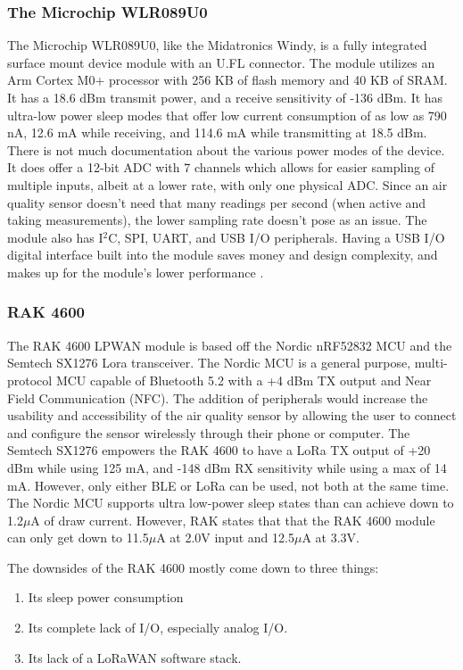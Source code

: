 \subsubsection{The Microchip WLR089U0}
The Microchip WLR089U0, like the Midatronics Windy, is a fully integrated
surface mount device module with an U.FL connector. The module utilizes an Arm
Cortex M0+ processor with 256 KB of flash memory and 40 KB of SRAM. It has a
18.6 dBm transmit power, and a receive sensitivity of -136 dBm. It has ultra-low
power sleep modes that offer low current consumption of as low as 790 nA, 12.6 mA
while receiving, and 114.6 mA while transmitting at 18.5 dBm. There is not much
documentation about the various power modes of the device. It does offer a
12-bit ADC with 7 channels which allows for easier sampling of multiple inputs,
albeit at a lower rate, with only one physical ADC. Since an air quality sensor
doesn't need that many readings per second (when active and taking
measurements), the lower sampling rate doesn't pose as an issue. The module also
has I$^2$C, SPI, UART, and USB I/O peripherals. Having a USB I/O digital
interface built into the module saves money and design complexity, and makes up
for the module's lower performance \cite{ds-wlr089u0}\cite{ds-atsamr34j18}.

\subsubsection{RAK 4600}
The RAK 4600 LPWAN module is based off the Nordic nRF52832 MCU and the
Semtech SX1276 Lora transceiver. The Nordic MCU is a general purpose,
multi-protocol MCU capable of Bluetooth 5.2 with a +4 dBm TX output and Near
Field Communication (NFC). The addition of peripherals would increase the
usability and accessibility of the air quality sensor by allowing the user to
connect and configure the sensor wirelessly through their phone or computer. The
Semtech SX1276 empowers the RAK 4600 to have a LoRa TX output of +20 dBm while
using 125 mA, and -148 dBm RX sensitivity while using a max of 14 mA. However,
only either BLE or LoRa can be used, not both at the same time. The Nordic MCU
supports ultra low-power sleep states than can achieve down to 1.2$\mu$A of draw
current. However, RAK states that that the RAK 4600 module can only get down to
11.5$\mu$A at 2.0V input and 12.5$\mu$A at 3.3V.

The downsides of the RAK 4600 mostly come down to three things:
\begin{enumerate}
    \item Its sleep power consumption
    \item Its complete lack of I/O, especially analog I/O.
    \item Its lack of a LoRaWAN software stack.
\end{enumerate}

